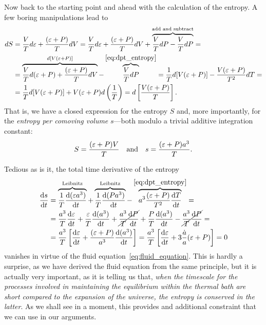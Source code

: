 Now back to the starting point and ahead with the calculation of the entropy.
A few boring manipulations lead to
\begin{align*}
  dS & = \frac{V}{T} d\varepsilon + \frac{(\varepsilon + P)}{T} dV =
  \frac{V}{T} d\varepsilon + \frac{(\varepsilon + P)}{T} dV  +
  \overbrace{\frac{V}{T} dP - \frac{V}{T} dP}^{\text{add and subtract}} =\\
  & = \overbrace{\frac{V}{T} d(\varepsilon + P) +
    \frac{(\varepsilon + P)}{T} dV}^{d[V(\varepsilon + P)]}
  - \overbrace{\frac{V}{T} dP}^{\eqref{eq:dpt_entropy}} =
  \frac{1}{T} d[V(\varepsilon + P)] -
  \frac{V (\varepsilon + P)}{T^2} dT = \\
  & = \frac{1}{T} d[V(\varepsilon + P)] +
  V (\varepsilon + P) d\left( \frac{1}{T} \right) =
  d\left[\frac{V(\varepsilon + P)}{T}\right].
\end{align*}
That is, we have a closed expression for the entropy $S$ and, more importantly,
for the \emph{entropy per comoving volume} $s$---both modulo a trivial additive
integration constant:
\begin{align}
  S = \frac{(\varepsilon + P) V}{T} \quad\text{and}\quad
  s = \frac{(\varepsilon + P) a^3}{T}.
\end{align}

Tedious as is it, the total time derivative of the entropy
\begin{align*}
  \dv{s}{t} & =
  \overbrace{\frac{1}{T}\dv{(\varepsilon a^3)}{t}}^{\text{Leibnitz}} +
  \overbrace{\frac{1}{T}\dv{(\ensuremath{P}a^3)}{t}}^{\text{Leibnitz}}
  - \overbrace{a^3 \frac{(\varepsilon + P)}{T^2} \dv{T}{t}}^{\eqref{eq:dpt_entropy}} = \\
  & = \frac{a^3}{T} \dv{\varepsilon}{t} + \frac{\varepsilon}{T} \dv{(a^3)}{t} +
  \cancel{\frac{a^3}{T} \dv{\ensuremath{P}}{t}} + \frac{P}{T} \dv{(a^3)}{t} -
  \cancel{\frac{a^3}{T} \dv{\ensuremath{P}}{t}} = \\
  & = \frac{a^3}{T} \left[ \dv{\varepsilon}{t} +
  \frac{(\varepsilon + P)}{a^3} \dv{(a^3)}{t} \right] =
  \frac{a^3}{T} \left[ \dv{\varepsilon}{t} +
  3 \frac{\dot{a}}{a} (\varepsilon + P) \right] = 0
\end{align*}
vanishes in virtue of the fluid equation~\eqref{eq:fluid_equation}. This is hardly
a surprise, as we have derived the fluid equation from the same principle, but it
is actually very important, as it is telling us that, \emph{when the timescale for
the processes involved in maintaining the equilibrium within the thermal bath are
short compared to the expansion of the universe, the entropy is conserved in the
latter}. As we shall see in a moment, this provides and additional constraint that
we can use in our arguments.

